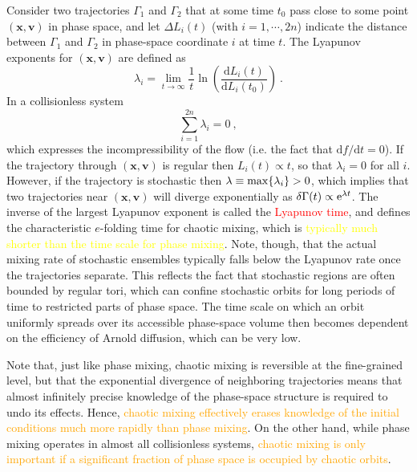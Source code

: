 \documentclass[12pt,a4paper]{article}
\renewcommand{\vec}[1]{\boldsymbol{#1}}
\newcommand{\dif}{\mathrm{d}}
\begin{document}
Consider two trajectories $\Gamma_1$ and $\Gamma_2$ that at some time $t_0$ pass close to some point $(\vec{x},\vec{v})$ in phase space, and let $\Delta L_i(t)$ (with $i = 1, \cdots, 2n$) indicate the distance between $\Gamma_1$ and $\Gamma_2$ in phase-space coordinate $i$ at time $t$. The Lyapunov exponents for $(\vec{x},\vec{v})$ are defined as
\begin{equation}
\lambda_i = \lim_{t \rightarrow \infty} \frac{1}{t} \ln \left(\dfrac{\dif L_i(t)}{\dif L_i(t_0)} \right) ~.
\end{equation}
In a collisionless system
\begin{equation}
\sum_{i=1}^{2n} \lambda_i = 0 ~,
\end{equation}
which expresses the incompressibility of the flow (i.e. the fact that $\dif f /\dif t = 0$). If the trajectory through $(\vec{x},\vec{v})$ is regular then $L_i(t) \propto t$, so that $\lambda_i = 0$ for all $i$. However, if the trajectory is stochastic then $\lambda \equiv {\rm max}\{\lambda_i\} > 0$, which implies that two trajectories near $(\vec{x},\vec{v})$ will diverge exponentially as $\delta \Gamma(t) \propto {\rm e}^{\lambda t}$. The inverse of the largest Lyapunov exponent is called the \textcolor{red}{Lyapunov time}, and defines the characteristic $e$-folding time for chaotic mixing, which is \textcolor{yellow}{typically much shorter than the time scale for phase mixing}. Note, though, that the actual mixing rate of stochastic ensembles typically falls below the Lyapunov rate once the trajectories separate. This reflects the fact that stochastic regions are often bounded by regular tori, which can confine stochastic orbits for long periods of time to restricted parts of phase space. The time scale on which an orbit uniformly spreads over its accessible phase-space volume then becomes dependent on the efficiency of Arnold diffusion, which can be very low.

Note that, just like phase mixing, chaotic mixing is reversible at the fine-grained level, but that the exponential divergence of neighboring trajectories means that almost infinitely precise knowledge of the phase-space structure is required to undo its effects. Hence, \textcolor{orange}{chaotic mixing effectively erases knowledge of the initial conditions much more rapidly than phase mixing}. On the other hand, while phase mixing operates in almost all collisionless systems, \textcolor{orange}{chaotic mixing is only important if a significant fraction of phase space is occupied by chaotic orbits}.
\end{document}
